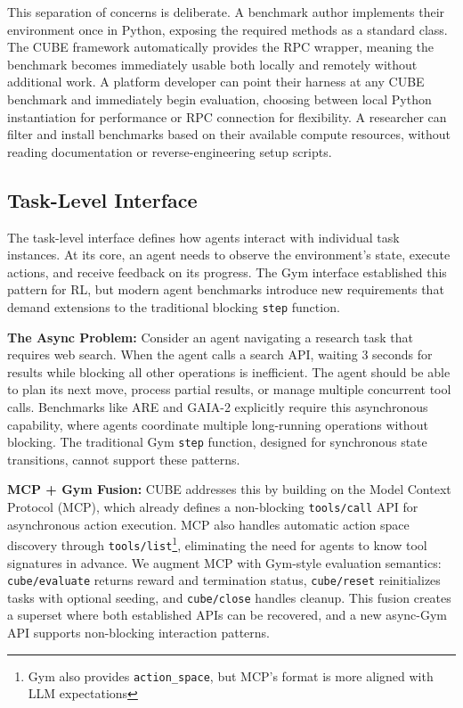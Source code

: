\documentclass{article}
\theoremstyle{plain}
\theoremstyle{definition}
\theoremstyle{remark}
\begin{document}
This separation of concerns is deliberate. A benchmark author implements their environment once in Python, exposing the required methods as a standard class. The CUBE framework automatically provides the RPC wrapper, meaning the benchmark becomes immediately usable both locally and remotely without additional work. A platform developer can point their harness at any CUBE benchmark and immediately begin evaluation, choosing between local Python instantiation for performance or RPC connection for flexibility. A researcher can filter and install benchmarks based on their available compute resources, without reading documentation or reverse-engineering setup scripts.

\subsection{Task-Level Interface}
\label{sec:task_level}

The task-level interface defines how agents interact with individual task instances. At its core, an agent needs to observe the environment's state, execute actions, and receive feedback on its progress. The Gym interface \citep{towers2024gymnasium, Brockman2016OpenAIG} established this pattern for RL, but modern agent benchmarks introduce new requirements that demand extensions to the traditional blocking \texttt{step} function.

\textbf{The Async Problem:} Consider an agent navigating a research task that requires web search. When the agent calls a search API, waiting 3 seconds for results while blocking all other operations is inefficient. The agent should be able to plan its next move, process partial results, or manage multiple concurrent tool calls. Benchmarks like ARE \citep{froger2025are} and GAIA-2 \citep{meta2026gaia2} explicitly require this asynchronous capability, where agents coordinate multiple long-running operations without blocking. The traditional Gym \texttt{step} function, designed for synchronous state transitions, cannot support these patterns.

\textbf{MCP + Gym Fusion:} CUBE addresses this by building on the Model Context Protocol (MCP), which already defines a non-blocking \texttt{tools/call} API for asynchronous action execution. MCP also handles automatic action space discovery through \texttt{tools/list}\footnote{Gym also provides \texttt{action\_space}, but MCP's format is more aligned with LLM expectations}, eliminating the need for agents to know tool signatures in advance. We augment MCP with Gym-style evaluation semantics: \texttt{cube/evaluate} returns reward and termination status, \texttt{cube/reset} reinitializes tasks with optional seeding, and \texttt{cube/close} handles cleanup. This fusion creates a superset where both established APIs can be recovered, and a new async-Gym API supports non-blocking interaction patterns.
\end{document}
